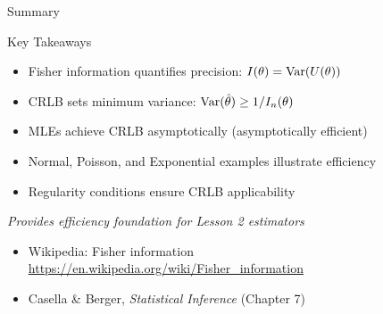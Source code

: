 \begin{frame}{Summary}
  \begin{block}{Key Takeaways}
    \begin{itemize}
      \item Fisher information quantifies precision: $I(\theta) = \operatorname{Var}(U(\theta))$
      \item CRLB sets minimum variance: $\operatorname{Var}(\hat{\theta}) \geq 1/I_n(\theta)$
      \item MLEs achieve CRLB asymptotically (asymptotically efficient)
      \item Normal, Poisson, and Exponential examples illustrate efficiency
      \item Regularity conditions ensure CRLB applicability
    \end{itemize}
  \end{block}

  \begin{center}
    \textit{Provides efficiency foundation for Lesson 2 estimators}
  \end{center}

  \footnotesize
  \begin{itemize}
    \item Wikipedia: Fisher information \url{https://en.wikipedia.org/wiki/Fisher_information}
    \item Casella \& Berger, \textit{Statistical Inference} (Chapter 7)
  \end{itemize}
\end{frame}